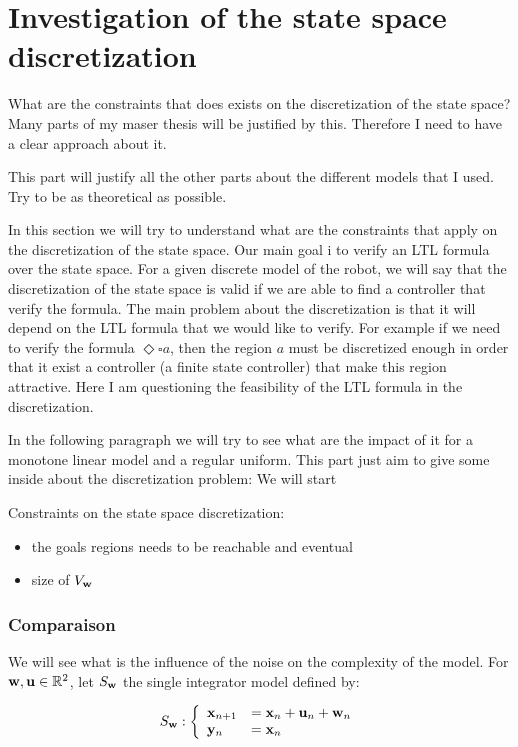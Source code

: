 \section{Investigation of the state space discretization}
What are the constraints that does exists on the discretization of the state space?
Many parts of my maser thesis will be justified by this.
Therefore I need to have a clear approach about it.

This part will justify all the other parts about the different models that I used.
Try to be as theoretical as possible.
 

In this section we will try to understand what are the constraints that apply on the discretization of the state space.
Our main goal i to verify an LTL formula over the state space. For a given discrete model of the robot, we will say that the discretization of the state space is valid if we are able to find a controller that verify the formula.
The main problem about the discretization is that it will depend on the LTL formula that we would like to verify. For example if we need to verify the formula $\Diamond \square a$, then the region $a$ must be discretized enough in order that it exist a controller (a finite state controller) that make this region attractive.
Here I am questioning the feasibility of the LTL formula in the discretization.

In the following paragraph we will try to see what are the impact of it for a monotone linear model and a regular uniform.
This part just aim to give some inside about the discretization problem:
We will start

Constraints on the state space discretization:
\begin{itemize}[noitemsep,nolistsep,topsep=0pt,parsep=0pt,partopsep=0pt]
\item the goals regions needs to be reachable and eventual
\item size of $V_{ \mathbf{w}}$
\end{itemize}


\subsubsection{Comparaison}
We will see what is the influence of the noise on the complexity of the model.
For $ \mathbf{w}, \mathbf{u} \in \mathbb{R}^2$, let $S_{ \mathbf{w}}$ the single integrator model defined by:

\begin{equation}\label{eqn:sing_int}
S_{ \mathbf{w}}:
\left \{
\begin{array}{ll}
 \mathbf{x}_{n+1} &=  \mathbf{x}_n +  \mathbf{u}_n +  \mathbf{w}_n\\
 \mathbf{y}_n &=  \mathbf{x}_n
\end{array}
\right.
\end{equation}

